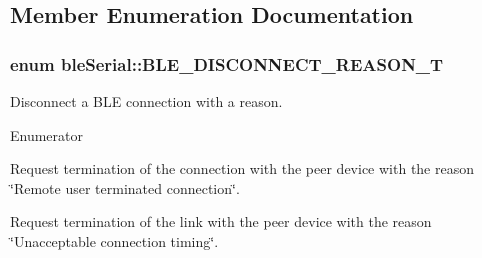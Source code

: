 \subsection{Member Enumeration Documentation}
\hypertarget{classble_serial_a5a50139216d995997ee79d3bd058bfe6}{
\subsubsection[{B\-L\-E\-\_\-\-D\-I\-S\-C\-O\-N\-N\-E\-C\-T\-\_\-\-R\-E\-A\-S\-O\-N\-\_\-\-T}]{\setlength{\rightskip}{0pt plus 5cm}enum {\bf ble\-Serial\-::\-B\-L\-E\-\_\-\-D\-I\-S\-C\-O\-N\-N\-E\-C\-T\-\_\-\-R\-E\-A\-S\-O\-N\-\_\-\-T}}}\label{classble_serial_a5a50139216d995997ee79d3bd058bfe6}
Disconnect a B\-L\-E connection with a reason. \begin{Desc}
\item[Enumerator]\par
\begin{description}
\item[{\em 
\hypertarget{classble_serial_a5a50139216d995997ee79d3bd058bfe6aed29c5e9584bc5b1a88b9fb00e9962f3}{B\-L\-E\-\_\-\-T\-E\-R\-M\-I\-N\-A\-T\-E\-D}\label{classble_serial_a5a50139216d995997ee79d3bd058bfe6aed29c5e9584bc5b1a88b9fb00e9962f3}
}]Request termination of the connection with the peer device with the reason \char`\"{}\-Remote user terminated connection\char`\"{}. \item[{\em 
\hypertarget{classble_serial_a5a50139216d995997ee79d3bd058bfe6a81c6b69282982367c7145cb4e438a2cb}{B\-L\-E\-\_\-\-U\-N\-A\-C\-C\-E\-P\-T\-A\-B\-L\-E}\label{classble_serial_a5a50139216d995997ee79d3bd058bfe6a81c6b69282982367c7145cb4e438a2cb}
}]Request termination of the link with the peer device with the reason \char`\"{}\-Unacceptable connection timing\char`\"{}. \end{description}
\end{Desc}
